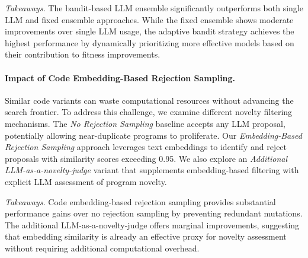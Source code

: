 \textit{Takeaways.} The bandit-based LLM ensemble significantly outperforms both single LLM and fixed ensemble approaches. While the fixed ensemble shows moderate improvements over single LLM usage, the adaptive bandit strategy achieves the highest performance by dynamically prioritizing more effective models based on their contribution to fitness improvements.

\paragraph{Impact of Code Embedding-Based Rejection Sampling.}
Similar code variants can waste computational resources without advancing the search frontier. To address this challenge, we examine different novelty filtering mechanisms. The \textit{No Rejection Sampling} baseline accepts any LLM proposal, potentially allowing near-duplicate programs to proliferate. Our \textit{Embedding-Based Rejection Sampling} approach leverages text embeddings to identify and reject proposals with similarity scores exceeding 0.95. We also explore an \textit{Additional LLM-as-a-novelty-judge} variant that supplements embedding-based filtering with explicit LLM assessment of program novelty.

\textit{Takeaways.} Code embedding-based rejection sampling provides substantial performance gains over no rejection sampling by preventing redundant mutations. The additional LLM-as-a-novelty-judge offers marginal improvements, suggesting that embedding similarity is already an effective proxy for novelty assessment without requiring additional computational overhead.


